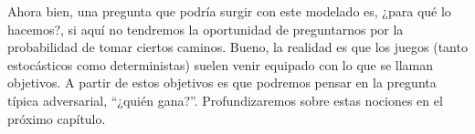 Ahora bien, una pregunta que podría surgir con este modelado es, ¿para qué lo
hacemos?, si aquí no tendremos la oportunidad de preguntarnos por la
probabilidad de tomar ciertos caminos. Bueno, la realidad es que los juegos
(tanto estocásticos como deterministas) suelen venir equipado con lo que se
llaman objetivos. A partir de estos objetivos es que podremos pensar en la
pregunta típica adversarial, ``¿quién gana?''. Profundizaremos sobre estas
nociones en el próximo capítulo.





